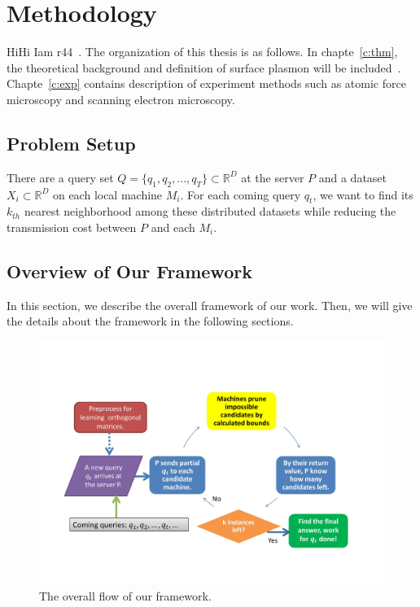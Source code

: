 \chapter{Methodology}
\label{c:method}

HiHi Iam r44~. The organization of this thesis is as follows. In chapte~\ref{c:thm}, the theoretical background and definition of surface plasmon will be included~\cite{LeeWave}. Chapte~\ref{c:exp} contains description of experiment methods such as atomic force microscopy and scanning electron microscopy. 

\section{Problem Setup}
\label{s:probsetup}
There are a query set $Q={\{q_1,q_2,...,q_T\}}\subset\mathbb{R}^D$ at the server $P$ and a dataset $X_i\subset\mathbb{R}^D$ on each local machine $M_i$.  For each coming query $q_t$, we want to find its $k_{th}$ nearest neighborhood among these distributed datasets while reducing the transmission cost between $P$ and each $M_i$.

\section{Overview of Our Framework}
\label{s:overview}
In this section, we describe the overall framework of our work.  Then, we will give the details about the framework in the following sections.

\begin{figure}[htpb!]
  \centering
    \includegraphics[width=1.0\textwidth]{fig/flow.jpg}
    \caption{\label{fig:flow}The overall flow of our framework.}
\end{figure}

